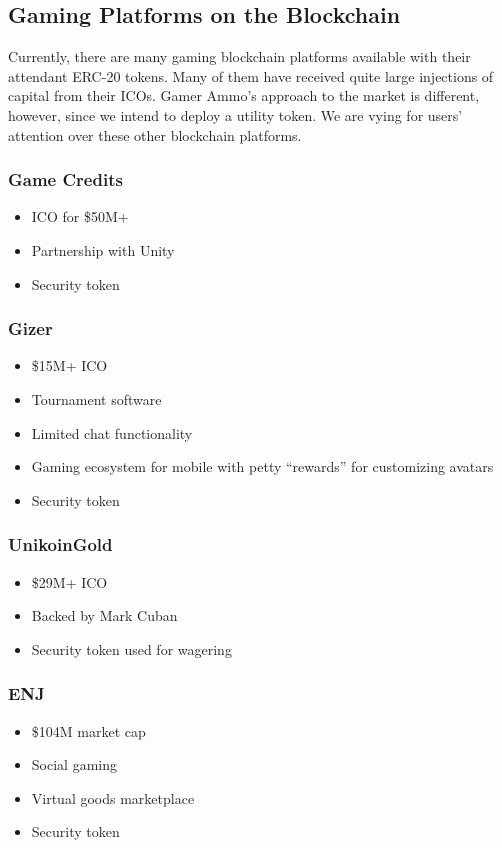 \documentclass[11pt]{report}
\begin{document}
\subsection{Gaming Platforms on the Blockchain}
Currently, there are many gaming blockchain platforms available with their attendant ERC-20 tokens. Many of them have received quite large injections of capital from their ICOs. Gamer Ammo's approach to the market is different, however, since we intend to deploy a utility token. We are vying for users' attention over these other blockchain platforms.
\subsubsection{Game Credits\cite{gamecredits}}
\begin{itemize}
\item ICO for \$50M+
\item Partnership with Unity
\item Security token
\end{itemize}
\subsubsection{Gizer\cite{gizer}}
\begin{itemize}
\item \$15M+ ICO
\item Tournament software
\item Limited chat functionality
\item Gaming ecosystem for mobile with petty ``rewards'' for customizing avatars
\item Security token
\end{itemize}
\subsubsection{UnikoinGold\cite{unikoingold}}
\begin{itemize}
\item \$29M+ ICO
\item Backed by Mark Cuban
\item Security token used for wagering
\end{itemize}
\subsubsection{ENJ\cite{enj}}
\begin{itemize}
\item \$104M market cap
\item Social gaming
\item Virtual goods marketplace
\item Security token
\end{itemize}
\end{document}
